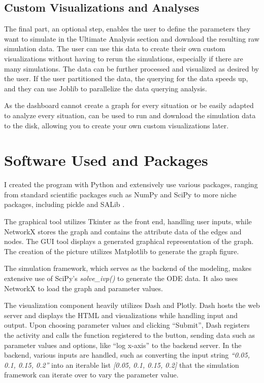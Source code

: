 \subsection{Custom Visualizations and Analyses} 
\label{sec:custom_visualizations_and_framework}
The final part, an optional step, enables the user to define the parameters they want to simulate in the Ultimate Analysis section and download the resulting raw simulation data. 
The user can use this data to create their own custom visualizations without having to rerun the simulations, especially if there are many simulations. 
The data can be further processed and visualized as desired by the user. 
If the user partitioned the data, the querying for the data speeds up, and they  can use Joblib to parallelize the data querying analysis. 

As the dashboard cannot create a graph for every situation or be easily adapted to analyze every situation,  can be used to run and download the simulation data to the disk, allowing you to create your own custom visualizations later. 

\section{Software Used and Packages}
I created the program with Python \cite{Python} and extensively use various packages, ranging from standard scientific packages such as NumPy \cite{NumPy} and SciPy to more niche packages, including pickle and SALib \cite{iwanagaSALib20Advancing2022, hermanSALibOpensourcePython2017}.

The graphical tool utilizes Tkinter as the front end, handling user inputs, while NetworkX \cite{hagbergExploringNetworkStructure2008} stores the graph and contains the attribute data of the edges and nodes. 
The GUI tool displays a generated graphical representation of the graph. 
The creation of the picture utilizes Matplotlib \cite{Matplotlib} to generate the graph figure. 

The simulation framework, which serves as the backend of the modeling, makes extensive use of SciPy’s \textit{solve\_ivp()} to generate the ODE data. 
It also uses NetworkX to load the graph and parameter values. 

The visualization component heavily utilizes Dash and Plotly. 
Dash hosts the web server and displays the HTML and visualizations while handling input and output. 
Upon choosing parameter values and clicking “Submit”, Dash registers the activity and calls the function registered to the button, sending data such as parameter values and options, like “log x-axis” to the backend server. 
In the backend, various inputs are handled, such as converting the input string \textit{“0.05, 0.1, 0.15, 0.2”} into an iterable list \textit{[0.05, 0.1, 0.15, 0.2]} that the simulation framework can iterate over to vary the parameter value. 

